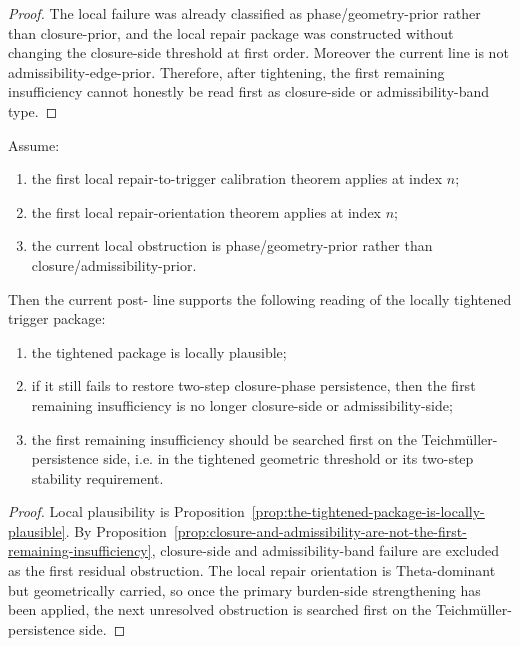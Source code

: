 \begin{proof}
The local failure was already classified as phase/geometry-prior rather than closure-prior, and the local repair package was constructed without changing the closure-side threshold at first order.
Moreover the current line is not admissibility-edge-prior.
Therefore, after tightening, the first remaining insufficiency cannot honestly be read first as closure-side or admissibility-band type.
\end{proof}

\begin{theorem}
\label{thm:first-tightened-package-plausibility-theorem}
Assume:
\begin{enumerate}
 \item the first local repair-to-trigger calibration theorem applies at index $n$;
 \item the first local repair-orientation theorem applies at index $n$;
 \item the current local obstruction is phase/geometry-prior rather than closure/admissibility-prior.
\end{enumerate}
Then the current post- line supports the following reading of the locally tightened trigger package:
\begin{enumerate}
 \item the tightened package is locally plausible;
 \item if it still fails to restore two-step closure-phase persistence, then the first remaining insufficiency is no longer closure-side or admissibility-side;
 \item the first remaining insufficiency should be searched first on the Teichm\"uller-persistence side, i.e. in the tightened geometric threshold or its two-step stability requirement.
\end{enumerate}
\end{theorem}

\begin{proof}
Local plausibility is Proposition~\ref{prop:the-tightened-package-is-locally-plausible}.
By Proposition~\ref{prop:closure-and-admissibility-are-not-the-first-remaining-insufficiency}, closure-side and admissibility-band failure are excluded as the first residual obstruction.
The local repair orientation is Theta-dominant but geometrically carried, so once the primary burden-side strengthening has been applied, the next unresolved obstruction is searched first on the Teichm\"uller-persistence side.
\end{proof}

